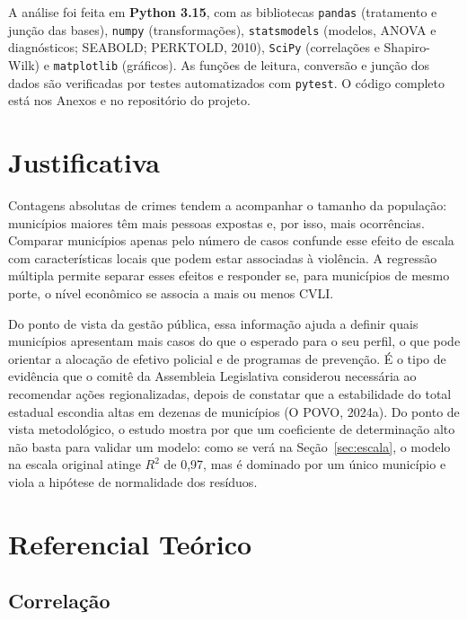 \documentclass[12pt,a4paper]{article}
\begin{document}
	A análise foi feita em \textbf{Python 3.15}, com as bibliotecas \texttt{pandas} (tratamento e junção das bases), \texttt{numpy} (transformações), \texttt{statsmodels} (modelos, ANOVA e diagnósticos; SEABOLD; PERKTOLD, 2010), \texttt{SciPy} (correlações e Shapiro-Wilk) e \texttt{matplotlib} (gráficos). As funções de leitura, conversão e junção dos dados são verificadas por testes automatizados com \texttt{pytest}. O código completo está nos Anexos e no repositório do projeto.
	
	\newpage
	
	\section{Justificativa}
	
	Contagens absolutas de crimes tendem a acompanhar o tamanho da população: municípios maiores têm mais pessoas expostas e, por isso, mais ocorrências. Comparar municípios apenas pelo número de casos confunde esse efeito de escala com características locais que podem estar associadas à violência. A regressão múltipla permite separar esses efeitos e responder se, para municípios de mesmo porte, o nível econômico se associa a mais ou menos CVLI.
	
	Do ponto de vista da gestão pública, essa informação ajuda a definir quais municípios apresentam mais casos do que o esperado para o seu perfil, o que pode orientar a alocação de efetivo policial e de programas de prevenção. É o tipo de evidência que o comitê da Assembleia Legislativa considerou necessária ao recomendar ações regionalizadas, depois de constatar que a estabilidade do total estadual escondia altas em dezenas de municípios (O POVO, 2024a). Do ponto de vista metodológico, o estudo mostra por que um coeficiente de determinação alto não basta para validar um modelo: como se verá na Seção~\ref{sec:escala}, o modelo na escala original atinge $R^2$ de 0,97, mas é dominado por um único município e viola a hipótese de normalidade dos resíduos.
	
	\newpage
	
	\section{Referencial Teórico}
	
	\subsection{Correlação}
	
\end{document}
